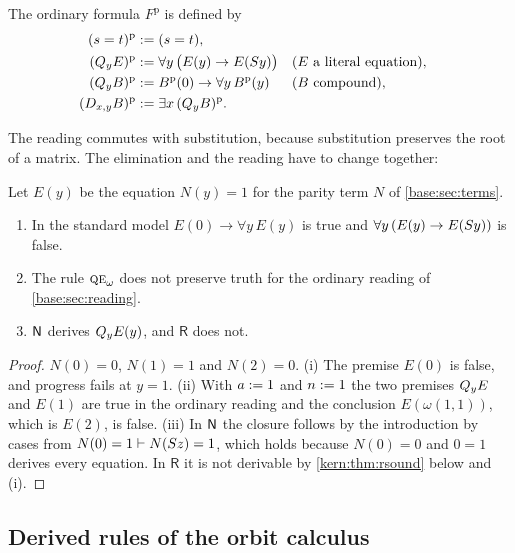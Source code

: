 \begin{definition}
\label{kern:def:preading}
The ordinary formula $F^{\mathrm{p}}$ is defined by
\begin{align*}
 (s=t)^{\mathrm{p}} &\mathrel{:=} (s=t),\\
 (Q_{y}E)^{\mathrm{p}} &\mathrel{:=} \forall y\,\bigl(E(y)\to E(S y)\bigr)
  && (E\text{ a literal equation}),\\
 (Q_{y}B)^{\mathrm{p}} &\mathrel{:=}
  B^{\mathrm{p}}(0)\to\forall y\,B^{\mathrm{p}}(y)
  && (B\text{ compound}),\\
 (D_{x,y}B)^{\mathrm{p}} &\mathrel{:=} \exists x\,(Q_{y}B)^{\mathrm{p}} .
\end{align*}
\end{definition}

The reading commutes with substitution, because substitution preserves the
root of a matrix.  The elimination and the reading have to change together:

\begin{proposition}
\label{kern:prop:parity}
Let $E(y)$ be the equation $N(y)=1$ for the parity term $N$ of
\cref{base:sec:terms}.
\begin{enumerate}[label=\textup{(\roman*)}]
\item In the standard model $E(0)\to\forall y\,E(y)$ is true and
 $\forall y\,(E(y)\to E(S y))$ is false.
\item The rule $\rulename{QE}_{\omega}$ does not preserve truth for the
 ordinary reading of \cref{base:sec:reading}.
\item $\mathsf{N}$ derives $Q_{y}E(y)$, and $\mathsf{R}$ does not.
\end{enumerate}
\end{proposition}

\begin{proof}
$N(0)=0$, $N(1)=1$ and $N(2)=0$.  (i) The premise $E(0)$ is false, and
progress fails at $y=1$.  (ii) With $a\mathrel{:=} 1$ and $n\mathrel{:=} 1$ the two
premises $Q_{y}E$ and $E(1)$ are true in the ordinary reading and the
conclusion $E(\omega(1,1))$, which is $E(2)$, is false.  (iii) In $\mathsf{N}$ the
closure follows by the introduction by cases from $N(0)=1\vdash
N(S z)=1$, which holds because $N(0)=0$ and $0=1$ derives every equation.
In $\mathsf{R}$ it is not derivable by \cref{kern:thm:rsound} below and (i).
\end{proof}

\subsection{Derived rules of the orbit calculus}
\label{kern:sec:Rrules}

